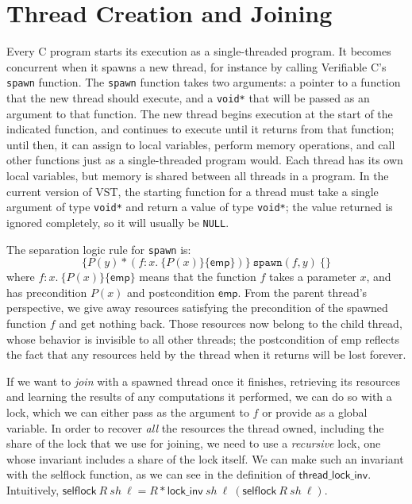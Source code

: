 \documentclass[11pt]{article}
\begin{document}
\section{Thread Creation and Joining}
\label{threads}
Every C program starts its execution as a single-threaded program. It becomes concurrent when it spawns a new thread, for instance by calling Verifiable C's \texttt{spawn} function. The \texttt{spawn} function takes two arguments: a pointer to a function that the new thread should execute, and a \texttt{void*} that will be passed as an argument to that function. The new thread begins execution at the start of the indicated function, and continues to execute until it returns from that function; until then, it can assign to local variables, perform memory operations, and call other functions just as a single-threaded program would. Each thread has its own local variables, but memory is shared between all threads in a program. In the current version of VST, the starting function for a thread must take a single argument of type \texttt{void*} and return a value of type \texttt{void*}; the value returned is ignored completely, so it will usually be \texttt{NULL}.

The separation logic rule for \texttt{spawn} is:
$$\{P(y) * (f : x.\ \{P(x)\}\{\mathsf{emp}\})\}\ \texttt{spawn}(f, y)\ \{\}$$
where $f : x.\ \{P(x)\}\{\mathsf{emp}\}$ means that the function $f$ takes a parameter $x$, and has precondition $P(x)$ and postcondition $\mathsf{emp}$. From the parent thread's perspective, we give away resources satisfying the precondition of the spawned function $f$ and get nothing back. Those resources now belong to the child thread, whose behavior is invisible to all other threads; the postcondition of \textsf{emp} reflects the fact that any resources held by the thread when it returns will be lost forever.

If we want to \emph{join} with a spawned thread once it finishes, retrieving its resources and learning the results of any computations it performed, we can do so with a lock, which we can either pass as the argument to $f$ or provide as a global variable. In order to recover \emph{all} the resources the thread owned, including the share of the lock that we use for joining, we need to use a \emph{recursive} lock, one whose invariant includes a share of the lock itself. We can make such an invariant with the \textsf{selflock} function, as we can see in the definition of $\mathsf{thread\_lock\_inv}$. Intuitively, $\mathsf{selflock}\ R\ \mathit{sh}\ \ell = R * \mathsf{lock\_inv}\ \mathit{sh}\ \ell\ (\mathsf{selflock}\ R\ \mathit{sh}\ \ell)$. 
\end{document}
